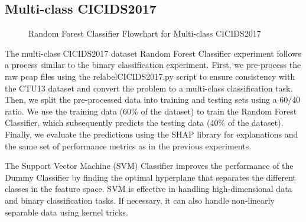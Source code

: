 \subsection{Multi-class CICIDS2017}\label{subsec:RandomForestMultiCICIDS2017}
\begin{figure}[H]
\centering
{}
\caption{Random Forest Classifier Flowchart for Multi-class CICIDS2017}\label{fig:RandomForestFlowMultiCICIDS2017}
\end{figure}

The multi-class CICIDS2017 dataset Random Forest Classifier experiment follows a process similar to the binary classification experiment. First, we pre-process the raw pcap files using the relabelCICIDS2017.py script to ensure consistency with the CTU13 dataset and convert the problem to a multi-class classification task. Then, we split the pre-processed data into training and testing sets using a 60/40 ratio. We use the training data (60\% of the dataset) to train the Random Forest Classifier, which subsequently predicts the testing data (40\% of the dataset). Finally, we evaluate the predictions using the SHAP library for explanations and the same set of performance metrics as in the previous experiments.

The Support Vector Machine (SVM) Classifier improves the performance of the Dummy Classifier by finding the optimal hyperplane that separates the different classes in the feature space. SVM is effective in handling high-dimensional data and binary classification tasks. If necessary, it can also handle non-linearly separable data using kernel tricks.


